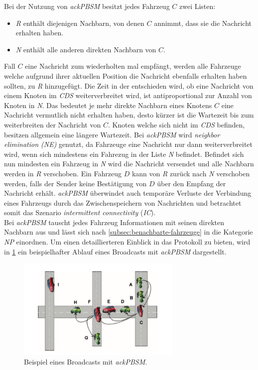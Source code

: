 \documentclass[english,runningheads,a4paper]{llncs}[2018/03/10]
\begin{document}
Bei der Nutzung von \textit{ackPBSM} besitzt jedes Fahrzeug $C$ zwei Listen:
\begin{itemize}
  \item \textit{R} enthält diejenigen Nachbarn, von denen $C$ annimmt, dass sie die Nachricht erhalten haben.
  \item \textit{N} enthält alle anderen direkten Nachbarn von $C$.
\end{itemize}
Fall $C$ eine Nachricht zum wiederholten mal empfängt, werden alle Fahrzeuge welche aufgrund ihrer aktuellen Position die Nachricht ebenfalls erhalten haben sollten, zu \textit{R} hinzugefügt.
Die Zeit in der entschieden wird, ob eine Nachricht von einem Knoten im \textit{CDS} weiterverbreitet wird, ist antiproportional zur Anzahl von Knoten in \textit{N}.
Das bedeutet je mehr direkte Nachbarn eines Knotens $C$ eine Nachricht vermutlich nicht erhalten haben, desto kürzer ist die Wartezeit bis zum weiterbreiten der Nachricht von $C$.
Knoten welche sich nicht im \textit{CDS} befinden, besitzen allgemein eine längere Wartezeit.
Bei \textit{ackPBSM} wird \textit{neighbor elimination (NE)} genutzt, da Fahrzeuge eine Nachricht nur dann weiterverbreitet wird, wenn sich mindestens ein Fahrezug in der Liste \textit{N} befindet.
Befindet sich nun mindesten ein Fahrzeug in \textit{N} wird die Nachricht versendet und alle Nachbarn werden in \textit{R} verschoben.
Ein Fahrzeug $D$ kann von \textit{R} zurück nach \textit{N} verschoben werden, falls der Sender keine Bestätigung von $D$ über den Empfang der Nachricht erhält.
\textit{ackPBSM} überwindet auch temporäre Verluste der Verbindung eines Fahrzeugs durch das Zwischenspeichern von Nachrichten und betrachtet somit das Szenario \textit{intermittent connectivity} (\textit{IC})\cite{conti2013mobile}.\\
Bei \textit{ackPBSM} tauscht jedes Fahrzeug Informationen mit seinen direkten Nachbarn aus und lässt sich nach \ref{subsec:benachbarte-fahrzeuge} in die Kategorie \textit{NP} einordnen.
Um einen detaillierteren Einblick in das Protokoll zu bieten, wird in \ref{fig:ackpbsm-example} ein beispielhafter Ablauf eines Broadcasts mit \textit{ackPBSM} dargestellt.

\begin{figure}[h]
  \centering
  \includegraphics[width=0.7\textwidth]{images/ackpbsm-example.png}
  \caption{Beispiel eines Broadcasts mit \textit{ackPBSM}\cite{conti2013mobile}.}
  \label{fig:ackpbsm-example}
\end{figure}
\end{document}
